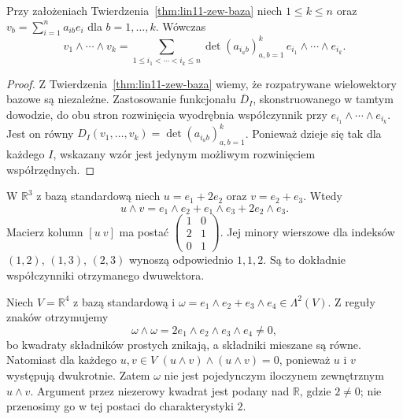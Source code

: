\begin{wniosek}
\label{cor:lin11-wedge-minory}
Przy założeniach
Twierdzenia~\ref{thm:lin11-zew-baza}
niech \(1\leq k\leq n\)
oraz
\(v_b=\sum_{i=1}^n a_{ib}e_i\)
dla \(b=1,\ldots,k\).
Wówczas
\[
 v_1\wedge\cdots\wedge v_k
 =\sum_{1\leq i_1<\cdots<i_k\leq n}
   \det(a_{i_a b})_{a,b=1}^k\,
   e_{i_1}\wedge\cdots\wedge e_{i_k}.
\]
\end{wniosek}
\begin{proof}
Z
Twierdzenia~\ref{thm:lin11-zew-baza}
wiemy, że rozpatrywane
wielowektory bazowe są niezależne.
Zastosowanie funkcjonału
\(\overline D_I\), skonstruowanego
w tamtym dowodzie, do obu stron
rozwinięcia wyodrębnia współczynnik
przy \(e_{i_1}\wedge\cdots\wedge e_{i_k}\).
Jest on równy
\(D_I(v_1,\ldots,v_k)
=\det(a_{i_a b})_{a,b=1}^k\).
Ponieważ dzieje się tak dla
każdego \(I\), wskazany wzór
jest jedynym możliwym
rozwinięciem współrzędnych.
\end{proof}

\begin{przyklad}
\label{prz:lin11-dwuwektor}
W \(\mathbb R^3\) z bazą
standardową niech
\(u=e_1+2e_2\) oraz
\(v=e_2+e_3\).
Wtedy
\[
 u\wedge v
 =e_1\wedge e_2+
  e_1\wedge e_3+
  2e_2\wedge e_3.
\]
Macierz kolumn \([u\ v]\)
ma postać
\(\begin{pmatrix}1&0\\2&1\\0&1\end{pmatrix}\).
Jej minory wierszowe
dla indeksów \((1,2)\),
\((1,3)\), \((2,3)\)
wynoszą odpowiednio
\(1,1,2\). Są to dokładnie
współczynniki otrzymanego
dwuwektora.
\end{przyklad}

\begin{przyklad}
\label{prz:lin11-nieprosty}
Niech \(V=\mathbb R^4\)
z bazą standardową i
\(\omega=e_1\wedge e_2+
e_3\wedge e_4\in\Lambda^2(V)\).
Z reguły znaków otrzymujemy
\[
 \omega\wedge\omega
 =2e_1\wedge e_2\wedge e_3\wedge e_4
 \ne0,
\]
bo kwadraty składników prostych
znikają, a składniki mieszane
są równe. Natomiast dla
każdego \(u,v\in V\)
\((u\wedge v)\wedge(u\wedge v)=0\),
ponieważ \(u\) i \(v\)
występują dwukrotnie.
Zatem \(\omega\) nie jest
pojedynczym iloczynem
zewnętrznym \(u\wedge v\).
Argument przez niezerowy
kwadrat jest podany nad
\(\mathbb R\), gdzie \(2\ne0\);
nie przenosimy go w tej
postaci do charakterystyki \(2\).
\end{przyklad}


